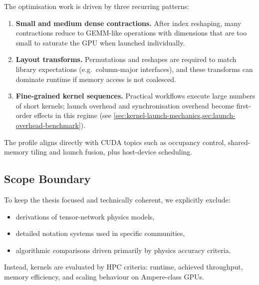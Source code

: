 The optimisation work is driven by three recurring patterns:

\begin{enumerate}
  \item \textbf{Small and medium dense contractions.} After index reshaping,
    many contractions reduce to GEMM-like operations with dimensions that are
    too small to saturate the GPU when launched individually.
  \item \textbf{Layout transforms.} Permutations and reshapes are required to
    match library expectations (e.g.\ column-major interfaces), and these
    transforms can dominate runtime if memory access is not coalesced.
  \item \textbf{Fine-grained kernel sequences.} Practical workflows execute
    large numbers of short kernels; launch overhead and synchronisation
    overhead become first-order effects in this regime (see
    \cref{sec:kernel-launch-mechanics,sec:launch-overhead-benchmark}).
\end{enumerate}

The profile aligns directly with CUDA topics such as occupancy control,
shared-memory tiling and launch fusion, plus host-device scheduling.

\subsection{Scope Boundary}\label{sec:tn-scope-boundary}

To keep the thesis focused and technically coherent, we explicitly exclude:

\begin{itemize}
  \item derivations of tensor-network physics models,
  \item detailed notation systems used in specific communities,
  \item algorithmic comparisons driven primarily by physics accuracy criteria.
\end{itemize}

Instead, kernels are evaluated by HPC criteria: runtime, achieved throughput,
memory efficiency, and scaling behaviour on Ampere-class GPUs.

